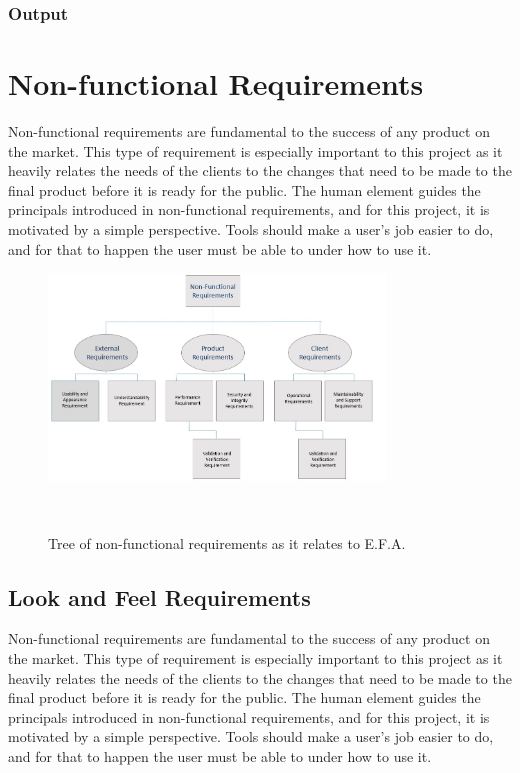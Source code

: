 \documentclass[12pt]{report}
\begin{document}
\subsection{Output}

\chapter{Non-functional Requirements}\label{ch:NonFunc}
Non-functional requirements are fundamental to the success of any product on the market. This type 
of requirement is especially important to this project as it heavily relates the needs of the 
clients to the changes that need to be made to the final product before it is ready for the public. 
The human element guides the principals introduced in non-functional requirements, and for this 
project, it is motivated by a simple perspective. Tools should make a user’s job easier to do, and 
for that to happen the user must be able to under how to use it. 
\begin{figure}[!htb]
	\centering
	\includegraphics[width=0.8\textwidth]{../figures/NONFUNCTIONAL}
	\caption{Tree of non-functional requirements as it relates to E.F.A.}~\label{fig:figure2}
\end{figure}
\section{Look and Feel Requirements}\label{sec:LookAndFeel} 
Non-functional requirements are fundamental to the success of any product on the market. This type 
of requirement is especially important to this project as it heavily relates the needs of the 
clients to the changes that need to be made to the final product before it is ready for the public. 
The human element guides the principals introduced in non-functional requirements, and for this 
project, it is motivated by a simple perspective. Tools should make a user’s job easier to do, and 
for that to happen the user must be able to under how to use it.  
\end{document}
